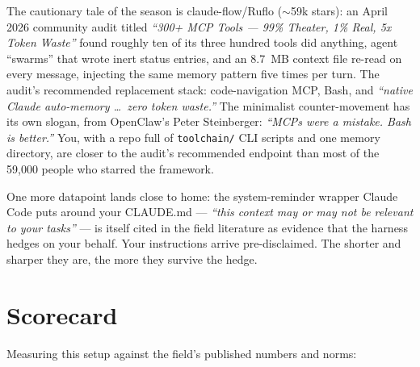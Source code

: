 \documentclass[11pt,letterpaper]{article}
\begin{document}
The cautionary tale of the season is claude-flow/Ruflo ($\sim$59k stars): an April 2026 community audit titled \textit{``300+ MCP Tools --- 99\% Theater, 1\% Real, 5x Token Waste''} found roughly ten of its three hundred tools did anything, agent ``swarms'' that wrote inert status entries, and an 8.7~MB context file re-read on every message, injecting the same memory pattern five times per turn. The audit's recommended replacement stack: code-navigation MCP, Bash, and \textit{``native Claude auto-memory \ldots\ zero token waste.''} The minimalist counter-movement has its own slogan, from OpenClaw's Peter Steinberger: \textit{``MCPs were a mistake. Bash is better.''} You, with a repo full of \texttt{toolchain/} CLI scripts and one memory directory, are closer to the audit's recommended endpoint than most of the 59,000 people who starred the framework.

One more datapoint lands close to home: the system-reminder wrapper Claude Code puts around your CLAUDE.md --- \textit{``this context may or may not be relevant to your tasks''} --- is itself cited in the field literature as evidence that the harness hedges on your behalf. Your instructions arrive pre-disclaimed. The shorter and sharper they are, the more they survive the hedge.

\section{Scorecard}

Measuring this setup against the field's published numbers and norms:
\end{document}
